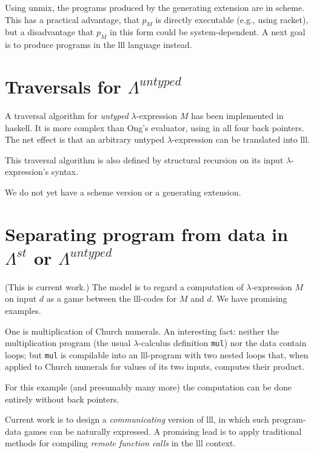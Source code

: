 \documentclass{llncs}
\begin{document}
\item Using {\sc unmix}, the programs produced by the generating extension are in {\sc scheme}. This has a practical advantage, that $p_M$ is directly executable (e.g., using {\sc racket}), but a disadvantage that $p_M$ in this form could be system-dependent. A next goal is to produce programs in the {\sc lll} language instead.

\ee

\section{Traversals for $\Lambda^{untyped}$}

\be

\item A traversal algorithm for {\em untyped} $\lambda$-expression $M$ has been implemented in {\sc haskell}. It is more complex than Ong's evaluator, using in all four back pointers. The net effect is that an arbitrary untyped $\lambda$-expression can be translated into {\sc lll}.

\item This traversal algorithm is also defined by structural recursion on its input $\lambda$-expression's syntax.

\item We do not yet have a {\sc scheme} version or a generating extension.

\ee


\section{Separating program from data in $\Lambda^{st}$ or $\Lambda^{untyped}$}

(This is current work.) The model is to regard a computation of $\lambda$-expression $M$ on input $d$ as a game between the {\sc lll}-codes for $M$ and $d$. We have promising examples. 

One is multiplication of Church numerals. An interesting fact: neither the multiplication program (the usual $\lambda$-calculus definition {\tt mul}) nor the data contain loops; but  {\tt mul} is compilable into an {\sc lll}-program with two nested loops that, when applied to Church numerals for  values of its two inputs,  computes their product.

For this example (and presumably many more) the computation can be done entirely without back pointers.
\vair

\fl Current work is to design a {\em communicating} version of {\sc lll}, in which such program-data games can be naturally expressed. A promising lead is to apply traditional methods for compiling {\em remote function calls} in the {\sc lll} context.
\end{document}
